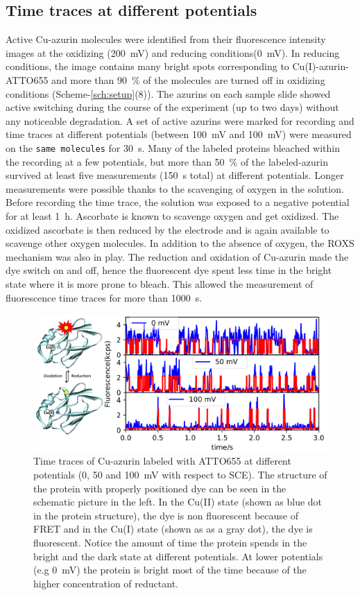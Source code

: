 \documentclass[journal=jacsat,manuscript=article]{achemso}
\begin{document}
\subsection{Time traces at different potentials}
Active Cu-azurin molecules were identified from their fluorescence intensity images at the oxidizing (\SI{200}{\mV}) and reducing conditions(\SI{0}{\mV}).
In reducing conditions, the image contains many bright spots corresponding to Cu(I)-azurin-ATTO655 and more than \SI{90}{\percent} of the molecules are turned off in oxidizing conditions 
(Scheme-\ref{sch:setup}(8)).
The azurins on each sample slide showed active switching during the course of the experiment (up to two days) without any noticeable degradation.
A set of active azurins were marked for recording and time traces at different potentials (between \SI{100}{\mV} and \SI{100}{\mV}) were measured on the \texttt{same molecules} 
for \SI{30}{\s}.
Many of the labeled proteins bleached within the recording at a few potentials, but more than \SI{50}{\percent} of the labeled-azurin survived at least five measurements (\SI{150}{\s}  total) at different potentials.
Longer measurements were possible thanks to the scavenging of oxygen in the solution.
Before recording the time trace, the solution was exposed to a negative potential for at least \SI{1}{\hour}.
Ascorbate is known to  scavenge oxygen\cite{dave1997effectiveness} and get oxidized.
The oxidized ascorbate is then reduced by the electrode and is again available to scavenge other oxygen molecules.
In addition to the absence of oxygen, the ROXS mechanism was also in play.\cite{cordes2009on}
The reduction and oxidation of Cu-azurin made the dye switch on and off, hence the fluorescent dye spent less time in the bright state where it is more prone to bleach.
This allowed the measurement of fluorescence time traces for more than \SI{1000}{\s}.\\
\begin{figure}
	\centering
	\includegraphics[]{Figure_1_timetrace_CuAzu}
	\caption{Time traces of Cu-azurin labeled with ATTO655 at different potentials (0, 50 and \SI{100}{\mV} with respect to SCE).
	The structure of the protein with properly positioned dye can be seen in the schematic picture in the left.
	In the Cu(II) state (shown as blue dot in the protein structure), the dye is non fluorescent because of FRET and in the Cu(I) state (shown as as a gray dot), the dye is fluorescent. Notice the amount of time the protein spends in the bright and the dark state at different potentials.
	At lower potentials (e.g \SI{0}{\mV}) the protein is bright most of the time because of the higher concentration of reductant.}
	\label{fig:timetrace}
\end{figure}
\end{document}
